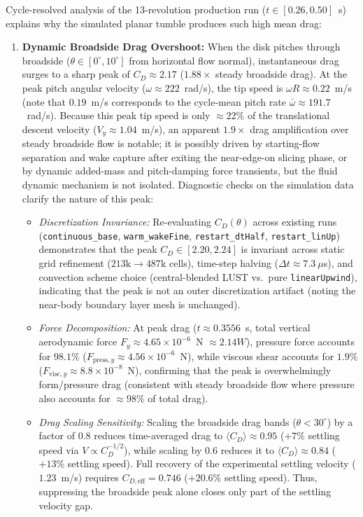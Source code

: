 \documentclass[11pt,a4paper]{article}
\begin{document}
Cycle-resolved analysis of the 13-revolution production run ($t \in [0.26, 0.50]$~s) explains why the simulated planar tumble produces such high mean drag:
\begin{enumerate}
    \item \textbf{Dynamic Broadside Drag Overshoot:} When the disk pitches through broadside ($\theta \in [0^\circ, 10^\circ]$ from horizontal flow normal), instantaneous drag surges to a sharp peak of $C_D \approx 2.17$ ($1.88\times$ steady broadside drag). At the peak pitch angular velocity ($\omega \approx 222$~rad/s), the tip speed is $\omega R \approx 0.22$~m/s (note that $0.19$~m/s corresponds to the cycle-mean pitch rate $\bar{\omega} \approx 191.7$~rad/s). Because this peak tip speed is only $\approx 22\%$ of the translational descent velocity ($V_y \approx 1.04$~m/s), an apparent $1.9\times$ drag amplification over steady broadside flow is notable; it is possibly driven by starting-flow separation and wake capture after exiting the near-edge-on slicing phase, or by dynamic added-mass and pitch-damping force transients, but the fluid dynamic mechanism is not isolated. Diagnostic checks on the simulation data clarify the nature of this peak:
    \begin{itemize}
        \item \emph{Discretization Invariance:} Re-evaluating $C_D(\theta)$ across existing runs (\texttt{continuous\_base}, \texttt{warm\_wakeFine}, \texttt{restart\_dtHalf}, \texttt{restart\_linUp}) demonstrates that the peak $C_D \in [2.20, 2.24]$ is invariant across static grid refinement ($213\mathrm{k} \to 487\mathrm{k}$ cells), time-step halving ($\Delta t \approx 7.3\ \mu$s), and convection scheme choice (central-blended LUST vs.\ pure \texttt{linearUpwind}), indicating that the peak is not an outer discretization artifact (noting the near-body boundary layer mesh is unchanged).
        \item \emph{Force Decomposition:} At peak drag ($t \approx 0.3556$~s, total vertical aerodynamic force $F_y \approx 4.65 \times 10^{-6}$~N $\approx 2.14 W$), pressure force accounts for $98.1\%$ ($F_{\mathrm{press},y} \approx 4.56 \times 10^{-6}$~N), while viscous shear accounts for $1.9\%$ ($F_{\mathrm{visc},y} \approx 8.8 \times 10^{-8}$~N), confirming that the peak is overwhelmingly form/pressure drag (consistent with steady broadside flow where pressure also accounts for $\approx 98\%$ of total drag).
        \item \emph{Drag Scaling Sensitivity:} Scaling the broadside drag bands ($\theta < 30^\circ$) by a factor of $0.8$ reduces time-averaged drag to $\langle C_D \rangle \approx 0.95$ ($+7\%$ settling speed via $V \propto C_D^{-1/2}$), while scaling by $0.6$ reduces it to $\langle C_D \rangle \approx 0.84$ ($+13\%$ settling speed). Full recovery of the experimental settling velocity ($1.23$~m/s) requires $C_{D,\mathrm{eff}} = 0.746$ ($+20.6\%$ settling speed). Thus, suppressing the broadside peak alone closes only part of the settling velocity gap.

\end{itemize}
\end{enumerate}
\end{document}
